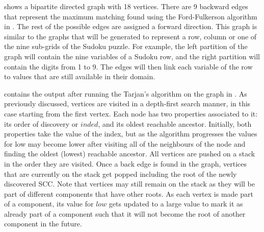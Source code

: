 \documentclass{l4proj}
\begin{document}
\noindent {} shows a bipartite directed graph with 18 vertices. There are 9 backward edges that represent the maximum matching found using the Ford-Fulkerson algorithm \cite{ford1956maximal} in . The rest of the possible edges are assigned a forward direction. This graph is similar to the graphs that will be generated to represent a row, column or one of the nine sub-grids of the Sudoku puzzle. For example, the left partition of the graph will contain the nine variables of a Sudoku row, and the right partition will contain the digits from 1 to 9. The edges will then link each variable of the row to values that are still available in their domain.

\noindent {} contains the output after running the Tarjan’s algorithm \cite{tarjan1972depth} on the graph in . As previously discussed, vertices are visited in a depth-first search manner, in this case starting from the first vertex. Each node has two properties associated to it: its order of discovery or $inded$, and its oldest reachable ancestor. Initially, both properties take the value of the index, but as the algorithm progresses the values for low may become lower after visiting all of the neighbours of the node and finding the oldest (lowest) reachable ancestor. All vertices are pushed on a stack in the order they are visited. Once a back edge is found in the graph, vertices that are currently on the stack get popped including the root of the newly discovered SCC. Note that vertices may still remain on the stack as they will be part of different components that have other roots. As each vertex is made part of a component, its value for $low$ gets updated to a large value to mark it as already part of a component such that it will not become the root of another component in the future.

\newpage
\end{document}
